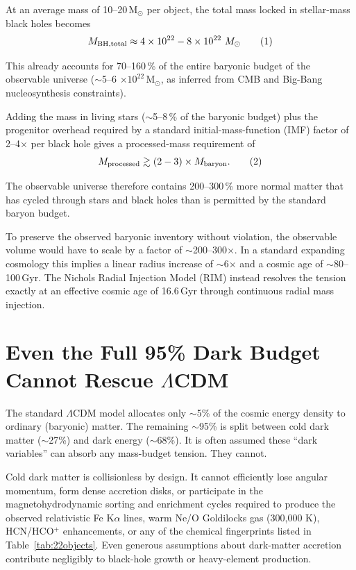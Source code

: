\documentclass[12pt]{article}
\begin{document}
At an average mass of 10--20\,M$_\odot$ per object, the total mass locked in stellar-mass black holes becomes
\[
M_{\rm BH,total} \approx 4 \times 10^{22} - 8 \times 10^{22}\ M_\odot \tag{1}
\]

This already accounts for 70--160\,\% of the entire baryonic budget of the observable universe ($\sim$5--6 $\times 10^{22}$\,M$_\odot$, as inferred from CMB and Big-Bang nucleosynthesis constraints).  

Adding the mass in living stars ($\sim$5--8\,\% of the baryonic budget) plus the progenitor overhead required by a standard initial-mass-function (IMF) factor of 2--4$\times$ per black hole gives a processed-mass requirement of
\[
M_{\rm processed} \gtrsim (2 - 3) \times M_{\rm baryon}. \tag{2}
\]

The observable universe therefore contains 200--300\,\% more normal matter that has cycled through stars and black holes than is permitted by the standard baryon budget.  

To preserve the observed baryonic inventory without violation, the observable volume would have to scale by a factor of $\sim$200--300$\times$. In a standard expanding cosmology this implies a linear radius increase of $\sim$6$\times$ and a cosmic age of $\sim$80--100\,Gyr. The Nichols Radial Injection Model (RIM) instead resolves the tension exactly at an effective cosmic age of 16.6\,Gyr through continuous radial mass injection.

\section{Even the Full 95\% Dark Budget Cannot Rescue $\Lambda$CDM}

The standard $\Lambda$CDM model allocates only $\sim$5\% of the cosmic energy density to ordinary (baryonic) matter. The remaining $\sim$95\% is split between cold dark matter ($\sim$27\%) and dark energy ($\sim$68\%). It is often assumed these “dark variables” can absorb any mass-budget tension. They cannot.

Cold dark matter is collisionless by design. It cannot efficiently lose angular momentum, form dense accretion disks, or participate in the magnetohydrodynamic sorting and enrichment cycles required to produce the observed relativistic Fe K$\alpha$ lines, warm Ne/O Goldilocks gas (300,000 K), HCN/HCO$^+$ enhancements, or any of the chemical fingerprints listed in Table~\ref{tab:22objects}. Even generous assumptions about dark-matter accretion contribute negligibly to black-hole growth or heavy-element production.
\end{document}

